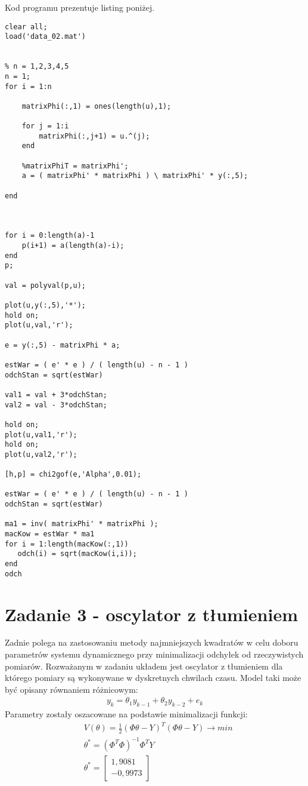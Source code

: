 \documentclass[a4paper,15pt]{article}
\begin{document}
Kod programu prezentuje listing poniżej.
\begin{lstlisting}[caption=Zadanie 2, captionpos=b,label=lis1, firstnumber=1,frame=single]
clear all;
load('data_02.mat')


% n = 1,2,3,4,5
n = 1;
for i = 1:n
    
    matrixPhi(:,1) = ones(length(u),1);
    
    for j = 1:i
        matrixPhi(:,j+1) = u.^(j); 
    end
    
    %matrixPhiT = matrixPhi';
    a = ( matrixPhi' * matrixPhi ) \ matrixPhi' * y(:,5);
    
end



for i = 0:length(a)-1
    p(i+1) = a(length(a)-i);
end
p;

val = polyval(p,u);

plot(u,y(:,5),'*');
hold on;
plot(u,val,'r');

e = y(:,5) - matrixPhi * a;

estWar = ( e' * e ) / ( length(u) - n - 1 )
odchStan = sqrt(estWar)

val1 = val + 3*odchStan;
val2 = val - 3*odchStan;

hold on;
plot(u,val1,'r');
hold on;
plot(u,val2,'r');

[h,p] = chi2gof(e,'Alpha',0.01);

estWar = ( e' * e ) / ( length(u) - n - 1 )
odchStan = sqrt(estWar)

ma1 = inv( matrixPhi' * matrixPhi );  
macKow = estWar * ma1
for i = 1:length(macKow(:,1))
   odch(i) = sqrt(macKow(i,i)); 
end
odch

\end{lstlisting}

\section{Zadanie 3 - oscylator z tłumieniem}
Zadnie polega na zastosowaniu metody najmniejszych kwadratów w celu doboru parametrów systemu dynamicznego przy minimalizacji odchyłek od rzeczywistych pomiarów. 
Rozważanym w zadaniu układem jest oscylator z tłumieniem dla którego pomiary są wykonywane w dyskretnych chwilach czasu. Model taki może być opisany równaniem różnicowym:
\begin{align*}
y_k = \theta_1 y_{k-1} + \theta_2 y_{k-2} + e_k
\end{align*}
Parametry zostały oszacowane na podstawie minimalizacji funkcji:
\begin{align*}
& V(\theta)=\frac{1}{2}(\Phi \theta - Y )^T(\Phi \theta - Y ) \rightarrow min \\
& \theta ^* = (\Phi ^T \Phi)^{-1} \Phi ^T Y \\
& \theta^* = 
\begin{bmatrix}
1,9081 \\
-0,9973
\end{bmatrix}
\end{align*}
\end{document}
